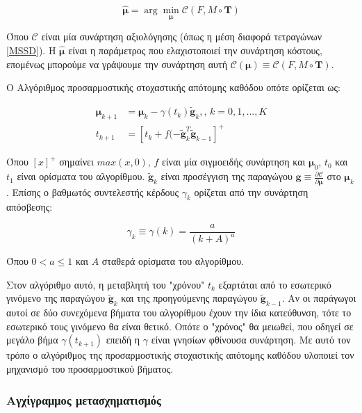 \documentclass[a4paper,12pt]{article}
\newcommand{\argminUnder}{\arg\!\min}
\begin{document}
\begin{equation*}
    \hat{\bm{\mu}} = \argminUnder_{\bm{\mu}} \mathcal{C} (F,M\circ \bm{T})
\end{equation*}

Όπου $\mathcal{C}$ είναι μία συνάρτηση αξιολόγησης (όπως η μέση διαφορά
τετραγώνων \ref{MSSD}). Η $\hat{\bm{\mu}}$ είναι η παράμετρος που ελαχιστοποιεί
την συνάρτηση κόστους, επομένως μπορούμε να γράψουμε την συνάρτηση αυτή
$\mathcal{C} (\bm{\mu}) \equiv \mathcal{C} (F,M\circ \bm{T})$.

Ο Αλγόριθμος προσαρμοστικής στοχαστικής απότομης καθόδου οπότε ορίζεται ως:

\begin{equation*}
\begin{split}
    \bm{\mu}_{k+1} &= \bm{\mu}_{k} - \gamma(t_k) \widetilde{\bm{g}}_{k},
    \text{,  }
    k=0,1,...,K
    \\
    t_{k+1} &= [t_k + f(-\widetilde{\bm{g}}_{k}^T \widetilde{\bm{g}}_{k-1}]^+
\end{split}
\end{equation*}

Όπου $[x]^+$ σημαίνει $max(x,0)$, $f$ είναι μία σιγμοειδής συνάρτηση και
$\bm{\mu}_{0}$, $t_0$ και $t_1$ είναι ορίσματα του αλγορίθμου.
$\widetilde{\bm{g}}_{k}$ είναι προσέγγιση της παραγώγου $\bm{g} \equiv \frac
{\partial \mathcal{C}} {\partial \bm{\mu}}$ στο $\bm{\mu}_k$. Επίσης ο βαθμωτός
συντελεστής κέρδους $\gamma_k$ ορίζεται από την συνάρτηση απόσβεσης: 

\begin{equation*}
    \gamma_k \equiv \gamma(k) = \frac {a} {(k+A)^a}
\end{equation*}

Όπου $0 < a \leq 1$ και $A$ σταθερά ορίσματα του αλγορίθμου.

Στον αλγόριθμο αυτό, η μεταβλητή του "χρόνου" $t_k$ εξαρτάται από το εσωτερικό
γινόμενο της παραγώγου $\widetilde{\bm{g}}_{k}$ και της προηγούμενης παραγώγου
$\widetilde{\bm{g}}_{k-1}$. Αν οι παράγωγοι αυτοί σε δύο συνεχόμενα βήματα του
αλγορίθμου έχουν την ίδια κατεύθυνση, τότε  το εσωτερικό τους γινόμενο θα είναι
θετικό. Οπότε ο "χρόνος" θα μειωθεί, που οδηγεί σε μεγάλο βήμα
$\gamma(t_{k+1})$ επειδή η $\gamma$ είναι γνησίων φθίνουσα συνάρτηση. Με αυτό
τον τρόπο ο αλγόριθμος της προσαρμοστικής στοχαστικής απότομης καθόδου υλοποιεί
τον μηχανισμό του προσαρμοστικού βήματος.

\subsubsection{Αγχίγραμμος μετασχηματισμός}
\end{document}
